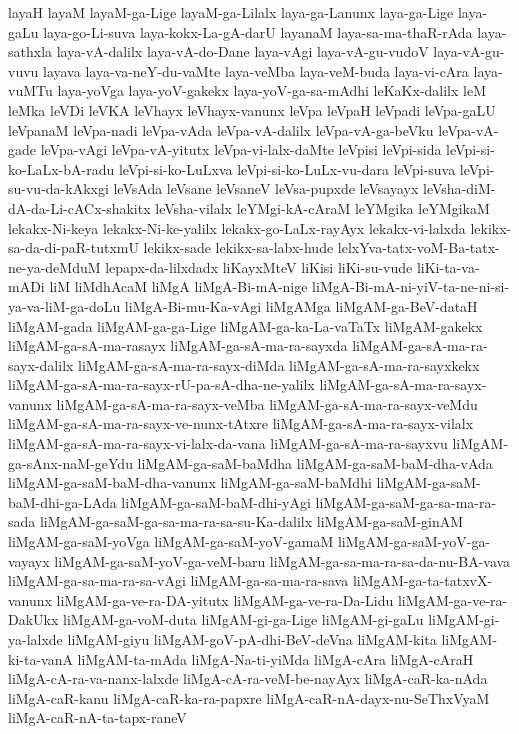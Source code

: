{layaH
layaM
layaM-ga-Lige
layaM-ga-Lilalx
laya-ga-Lanunx
laya-ga-Lige
laya-gaLu
laya-go-Li-suva
laya-kokx-La-gA-darU
layanaM
laya-sa-ma-thaR-rAda
laya-sathxla
laya-vA-dalilx
laya-vA-do-Dane
laya-vAgi
laya-vA-gu-vudoV
laya-vA-gu-vuvu
layava
laya-va-neY-du-vaMte
laya-veMba
laya-veM-buda
laya-vi-cAra
laya-vuMTu
laya-yoVga
laya-yoV-gakekx
laya-yoV-ga-sa-mAdhi
leKaKx-dalilx
leM
leMka
leVDi
leVKA
leVhayx
leVhayx-vanunx
leVpa
leVpaH
leVpadi
leVpa-gaLU
leVpanaM
leVpa-nadi
leVpa-vAda
leVpa-vA-dalilx
leVpa-vA-ga-beVku
leVpa-vA-gade
leVpa-vAgi
leVpa-vA-yitutx
leVpa-vi-lalx-daMte
leVpisi
leVpi-sida
leVpi-si-ko-LaLx-bA-radu
leVpi-si-ko-LuLxva
leVpi-si-ko-LuLx-vu-dara
leVpi-suva
leVpi-su-vu-da-kAkxgi
leVsAda
leVsane
leVsaneV
leVsa-pupxde
leVsayayx
leVsha-diM-dA-da-Li-cACx-shakitx
leVsha-vilalx
leYMgi-kA-cAraM
leYMgika
leYMgikaM
lekakx-Ni-keya
lekakx-Ni-ke-yalilx
lekakx-go-LaLx-rayAyx
lekakx-vi-lalxda
lekikx-sa-da-di-paR-tutxmU
lekikx-sade
lekikx-sa-labx-hude
lelxYva-tatx-voM-Ba-tatx-ne-ya-deMduM
lepapx-da-lilxdadx
liKayxMteV
liKisi
liKi-su-vude
liKi-ta-va-mADi
liM
liMdhAcaM
liMgA
liMgA-Bi-mA-nige
liMgA-Bi-mA-ni-yiV-ta-ne-ni-si-ya-va-liM-ga-doLu
liMgA-Bi-mu-Ka-vAgi
liMgAMga
liMgAM-ga-BeV-dataH
liMgAM-gada
liMgAM-ga-ga-Lige
liMgAM-ga-ka-La-vaTaTx
liMgAM-gakekx
liMgAM-ga-sA-ma-rasayx
liMgAM-ga-sA-ma-ra-sayxda
liMgAM-ga-sA-ma-ra-sayx-dalilx
liMgAM-ga-sA-ma-ra-sayx-diMda
liMgAM-ga-sA-ma-ra-sayxkekx
liMgAM-ga-sA-ma-ra-sayx-rU-pa-sA-dha-ne-yalilx
liMgAM-ga-sA-ma-ra-sayx-vanunx
liMgAM-ga-sA-ma-ra-sayx-veMba
liMgAM-ga-sA-ma-ra-sayx-veMdu
liMgAM-ga-sA-ma-ra-sayx-ve-nunx-tAtxre
liMgAM-ga-sA-ma-ra-sayx-vilalx
liMgAM-ga-sA-ma-ra-sayx-vi-lalx-da-vana
liMgAM-ga-sA-ma-ra-sayxvu
liMgAM-ga-sAnx-naM-geYdu
liMgAM-ga-saM-baMdha
liMgAM-ga-saM-baM-dha-vAda
liMgAM-ga-saM-baM-dha-vanunx
liMgAM-ga-saM-baMdhi
liMgAM-ga-saM-baM-dhi-ga-LAda
liMgAM-ga-saM-baM-dhi-yAgi
liMgAM-ga-saM-ga-sa-ma-ra-sada
liMgAM-ga-saM-ga-sa-ma-ra-sa-su-Ka-dalilx
liMgAM-ga-saM-ginAM
liMgAM-ga-saM-yoVga
liMgAM-ga-saM-yoV-gamaM
liMgAM-ga-saM-yoV-ga-vayayx
liMgAM-ga-saM-yoV-ga-veM-baru
liMgAM-ga-sa-ma-ra-sa-da-nu-BA-vava
liMgAM-ga-sa-ma-ra-sa-vAgi
liMgAM-ga-sa-ma-ra-sava
liMgAM-ga-ta-tatxvX-vanunx
liMgAM-ga-ve-ra-DA-yitutx
liMgAM-ga-ve-ra-Da-Lidu
liMgAM-ga-ve-ra-DakUkx
liMgAM-ga-voM-duta
liMgAM-gi-ga-Lige
liMgAM-gi-gaLu
liMgAM-gi-ya-lalxde
liMgAM-giyu
liMgAM-goV-pA-dhi-BeV-deVna
liMgAM-kita
liMgAM-ki-ta-vanA
liMgAM-ta-mAda
liMgA-Na-ti-yiMda
liMgA-cAra
liMgA-cAraH
liMgA-cA-ra-va-nanx-lalxde
liMgA-cA-ra-veM-be-nayAyx
liMgA-caR-ka-nAda
liMgA-caR-kanu
liMgA-caR-ka-ra-papxre
liMgA-caR-nA-dayx-nu-SeThxVyaM
liMgA-caR-nA-ta-tapx-raneV
}
